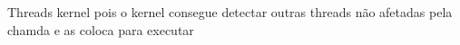 Threads kernel pois o kernel consegue detectar outras threads não afetadas pela chamda e as coloca para executar